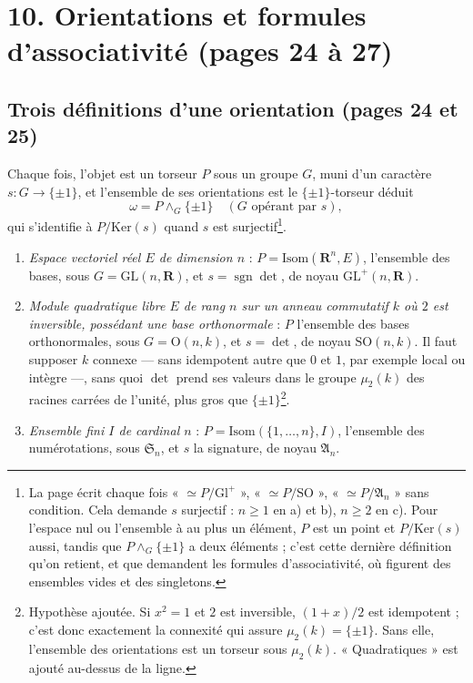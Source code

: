 \documentclass[11pt,a4paper]{article}
\begin{document}
\section*{10. Orientations et formules d'associativité (pages 24 à 27)}

\subsection*{Trois définitions d'une orientation (pages 24 et 25)}

Chaque fois, l'objet est un torseur $P$ sous un groupe $G$, muni d'un
caractère $s : G \to \{\pm 1\}$, et l'ensemble de ses orientations est le
$\{\pm 1\}$-torseur déduit
\[
  \omega = P \wedge_G \{\pm 1\} \quad (G \text{ opérant par } s),
\]
qui s'identifie à $P/\mathrm{Ker}(s)$ quand $s$ est surjectif\footnote{La page
écrit chaque fois « $\simeq P/\mathrm{Gl}^{+}$ », « $\simeq P/\mathrm{SO}$ »,
« $\simeq P/\mathfrak{A}_n$ » sans condition. Cela demande $s$ surjectif :
$n \geq 1$ en a) et b), $n \geq 2$ en c). Pour l'espace nul ou l'ensemble à au
plus un élément, $P$ est un point et $P/\mathrm{Ker}(s)$ aussi, tandis que
$P \wedge_G \{\pm 1\}$ a deux éléments ; c'est cette dernière définition qu'on
retient, et que demandent les formules d'associativité, où figurent des
ensembles vides et des singletons.}.
\begin{enumerate}
\item[a)] \emph{Espace vectoriel réel $E$ de dimension $n$} : $P =
\mathrm{Isom}(\mathbf{R}^n, E)$, l'ensemble des bases, sous $G = \mathrm{GL}(n,
\mathbf{R})$, et $s = \operatorname{sgn} \det$, de noyau $\mathrm{GL}^{+}(n,
\mathbf{R})$.
\item[b)] \emph{Module quadratique libre $E$ de rang $n$ sur un anneau
commutatif $k$ où $2$ est inversible, possédant une base orthonormale} : $P$
l'ensemble des bases orthonormales, sous $G = \mathrm{O}(n, k)$, et $s =
\det$, de noyau $\mathrm{SO}(n, k)$. Il faut supposer $k$ connexe --- sans
idempotent autre que $0$ et $1$, par exemple local ou intègre ---, sans quoi
$\det$ prend ses valeurs dans le groupe $\mu_2(k)$ des racines carrées de
l'unité, plus gros que $\{\pm 1\}$\footnote{Hypothèse ajoutée. Si $x^2 = 1$
et $2$ est inversible, $(1 + x)/2$ est idempotent ; c'est donc exactement la
connexité qui assure $\mu_2(k) = \{\pm 1\}$. Sans elle, l'ensemble des
orientations est un torseur sous $\mu_2(k)$. « Quadratiques » est ajouté
au-dessus de la ligne.}.
\item[c)] \emph{Ensemble fini $I$ de cardinal $n$} : $P =
\mathrm{Isom}(\{1, \ldots, n\}, I)$, l'ensemble des numérotations, sous
$\mathfrak{S}_n$, et $s$ la signature, de noyau $\mathfrak{A}_n$.
\end{enumerate}
\end{document}
